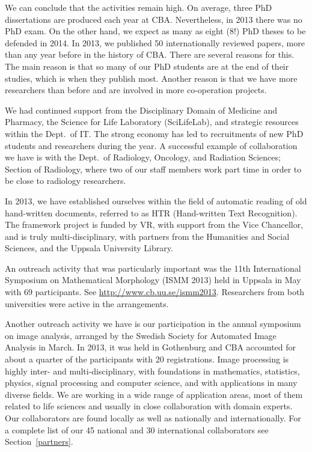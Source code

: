 
We can conclude that the activities remain high. On average, three PhD dissertations are produced each year at CBA. Nevertheless, in 2013 there was no PhD exam. On the other hand, we expect as many as eight (8!) PhD theses to be defended in 2014. In 2013, we published 50 internationally reviewed papers, more than any year before in the
history of CBA. There are several reasons for this. The main reason is that so many of our PhD students are at the end of their studies, which is when they publish most. Another reason is that we have more researchers than before and are involved in more co-operation projects.

We had continued support from the Disciplinary Domain of Medicine and Pharmacy, the Science for Life Laboratory (SciLifeLab), and strategic resources within the Dept.~of IT. The strong economy has led to recruitments of new PhD students and researchers during the year. A successful example of collaboration we have is with the Dept.~of Radiology, Oncology, and Radiation Sciences; Section of Radiology, where two of our staff members work part time in order to be close to radiology researchers. 

In 2013, we have established ourselves within the field of automatic reading of old hand-written documents, referred to as HTR (Hand-written Text Recognition). The framework project is funded by VR, with support from the Vice Chancellor, and is truly multi-disciplinary, with partners from the Humanities and Social Sciences, and the Uppsala University Library.

An outreach activity that was particularly important was the 11th International Symposium on Mathematical Morphology (ISMM 2013) held in Uppsala in May with 69 participants. See \url{http://www.cb.uu.se/ismm2013}. Researchers from both universities were active in the arrangements.

Another outreach activity we have is our participation in the annual symposium on image analysis, arranged by the Swedish Society for Automated Image Analysis in March. In 2013, it was held in Gothenburg and CBA accounted for about a quarter of the participants with 20 registrations.
\clearpage
Image processing is highly inter- and multi-disciplinary, with foundations in mathematics, statistics, physics, signal processing and computer science, and with applications in many diverse fields. We are working in a wide range of application areas, most of them related to life sciences and usually in close collaboration with domain experts. Our collaborators are found locally as well as nationally and internationally. 
For a complete list of our 45 national and 30 international collaborators see Section~\ref{partners}. 

